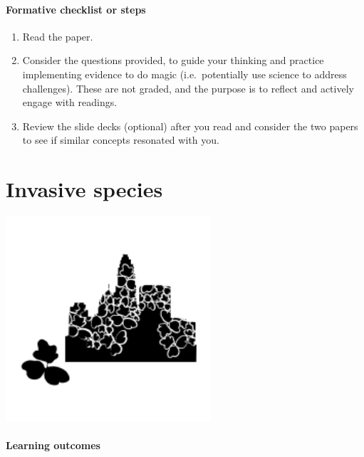 \documentclass[
]{book}
\providecommand{\tightlist}{%
  \setlength{\itemsep}{0pt}\setlength{\parskip}{0pt}}
\begin{document}
\hypertarget{formative-checklist-or-steps-1}{%
\subsubsection*{Formative checklist or steps}\label{formative-checklist-or-steps-1}}

\begin{enumerate}
\def\labelenumi{\arabic{enumi}.}
\tightlist
\item
  Read the paper.\\
\item
  Consider the questions provided, to guide your thinking and practice implementing evidence to do magic (i.e.~potentially use science to address challenges). These are not graded, and the purpose is to reflect and actively engage with readings.\\
\item
  Review the slide decks (optional) after you read and consider the two papers to see if similar concepts resonated with you.
\end{enumerate}

\hypertarget{invasions}{%
\chapter{Invasive species}\label{invasions}}

\includegraphics[width=3in,height=\textheight]{./invasion.png}

\hypertarget{learning-outcomes-3}{%
\subsubsection*{Learning outcomes}\label{learning-outcomes-3}}
\end{document}
